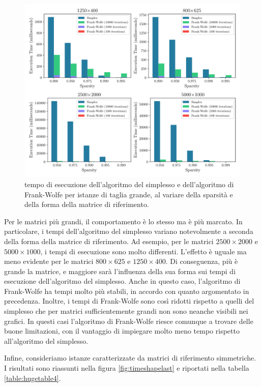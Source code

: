 \begin{figure}[!ht]
    \centering
    \includegraphics[width=\textwidth]{assets/figures/timeshape2.pdf}
    \caption{tempo di esecuzione dell'algoritmo del simplesso e dell'algoritmo di Frank-Wolfe per istanze di taglia
    grande, al variare della sparsità e della forma della matrice di riferimento.}
    \label{fig:timeshape2}
\end{figure}

Per le matrici più grandi, il comportamento è lo stesso ma è più marcato. In particolare, i tempi dell'algoritmo del
simplesso variano notevolmente a seconda della forma della matrice di riferimento. Ad esempio, per le matrici \(
2500\times 2000 \) e \( 5000\times 1000\), i tempi di esecuzione sono molto differenti. L'effetto è uguale ma meno
evidente per le matrici \( 800\times 625 \) e \( 1250\times 400 \). Di conseguenza, più è grande la matrice, e maggiore
sarà l'influenza della sua forma sui tempi di esecuzione dell'algoritmo del simplesso. Anche in questo caso, l'algoritmo
di Frank-Wolfe ha tempi molto più stabili, in accordo con quanto argomentato in precedenza. Inoltre, i tempi di
Frank-Wolfe sono così ridotti rispetto a quelli del simplesso che per matrici sufficientemente grandi non sono neanche
visibili nei grafici. In questi casi l'algoritmo di Frank-Wolfe riesce comunque a trovare delle buone limitazioni, con
il vantaggio di impiegare molto meno tempo rispetto all'algoritmo del simplesso.

Infine, consideriamo istanze caratterizzate da matrici di riferimento simmetriche. I risultati sono riassunti nella
figura \ref{fig:timeshapelast} e riportati nella tabella \ref{table:hugetable4}.

